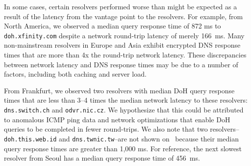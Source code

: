 In some cases, certain resolvers performed worse than might
be expected as a result of the latency from the vantage point to the
resolvers. 
For example, from North America, we
observed a median query response time of 872 ms to \texttt{doh.xfinity.com} 
despite a network round-trip latency of merely 166~ms.
Many non-mainstream resolvers in Europe and Asia exhibit encrypted DNS
response times that are more than 4x the round-trip network latency.
These discrepancies between network latency and DNS response times may be due 
to a number of factors, including both caching and server load.

From Frankfurt, we observed two resolvers with median DoH query response
times that are less than 3--4 times the median network latency to these resolvers:
\texttt{dns.switch.ch} and \texttt{odvr.nic.cz}.
We hypothesize that this could be attributed to anomalous ICMP ping data and
network optimizations that enable DoH queries to be completed in fewer
round-trips.
We also note that two resolvers--\texttt{doh.this.web.id} and
\texttt{dns.twnic.tw}--are not shown on~
because their median query response times are greater than 1,000 ms.
For reference, the next slowest resolver from Seoul has a median query response
time of 456~ms.

